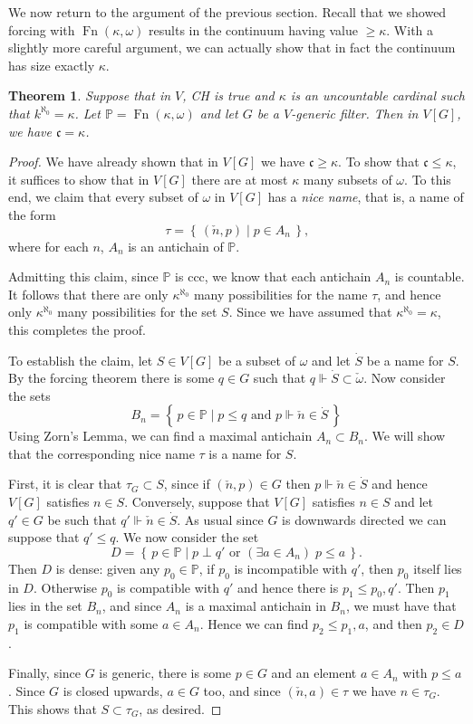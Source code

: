 \documentclass[11pt,oneside]{amsbook}
\newcommand{\set}[1]{\left\{\,#1\,\right\}}
\newcommand{\PP}{\mathbb P}
\newcommand{\forces}{\Vdash}
\DeclareMathOperator{\Fn}{Fn}
\theoremstyle{definition}
\theoremstyle{plain}
\newtheorem{theorem}{Theorem}[section]
\theoremstyle{definition}
\theoremstyle{remark}
\numberwithin{equation}{section}
\numberwithin{figure}{section}
\begin{document}
We now return to the argument of the previous section. Recall that we showed forcing with $\Fn(\kappa,\omega)$ results in the continuum having value $\geq\kappa$. With a slightly more careful argument, we can actually show that in fact the continuum has size exactly $\kappa$.

\begin{theorem}
  \label{thm:ch-exact}
  Suppose that in $V$, CH is true and $\kappa$ is an uncountable cardinal such that $k^{\aleph_0}=\kappa$. Let $\PP=\Fn(\kappa,\omega)$ and let $G$ be a $V$-generic filter. Then in $V[G]$, we have $\mathfrak c=\kappa$.
\end{theorem}

\begin{proof}
  We have already shown that in $V[G]$ we have $\mathfrak c\geq\kappa$. To show that $\mathfrak c\leq\kappa$, it suffices to show that in $V[G]$ there are at most $\kappa$ many subsets of $\omega$. To this end, we claim that every subset of $\omega$ in $V[G]$ has a \emph{nice name}, that is, a name of the form
  \[\tau=\set{(\check n,p)\mid p\in A_n}\text{,}
  \]
  where for each $n$, $A_n$ is an antichain of $\PP$.

  Admitting this claim, since $\PP$ is ccc, we know that each antichain $A_n$ is countable. It follows that there are only $\kappa^{\aleph_0}$ many possibilities for the name $\tau$, and hence only $\kappa^{\aleph_0}$ many possibilities for the set $S$. Since we have assumed that $\kappa^{\aleph_0}=\kappa$, this completes the proof.

  To establish the claim, let $S\in V[G]$ be a subset of $\omega$ and let $\dot S$ be a name for $S$. By the forcing theorem there is some $q\in G$ such that $q\forces\dot S\subset\check\omega$. Now consider the sets
  \[B_n=\set{p\in\PP\mid p\leq q\text{ and }p\forces\check n\in\dot S}
  \]
  Using Zorn's Lemma, we can find a maximal antichain $A_n\subset B_n$. We will show that the corresponding nice name $\tau$ is a name for $S$.

  First, it is clear that $\tau_G\subset S$, since if $(\check n,p)\in G$ then $p\forces\check n\in\dot S$ and hence $V[G]$ satisfies $n\in S$. Conversely, suppose that $V[G]$ satisfies $n\in S$ and let $q'\in G$ be such that $q'\forces\check n\in\dot S$. As usual since $G$ is downwards directed we can suppose that $q'\leq q$. We now consider the set
  \[D=\set{p\in\PP\mid p\perp q'\text{ or }(\exists a\in A_n)\;p\leq a}\text{.}
  \]
  Then $D$ is dense: given any $p_0\in\PP$, if $p_0$ is incompatible with $q'$, then $p_0$ itself lies in $D$. Otherwise $p_0$ is compatible with $q'$ and hence there is $p_1\leq p_0,q'$. Then $p_1$ lies in the set $B_n$, and since $A_n$ is a maximal antichain in $B_n$, we must have that $p_1$ is compatible with some $a\in A_n$. Hence we can find $p_2\leq p_1,a$, and then $p_2\in D$.

  Finally, since $G$ is generic, there is some $p\in G$ and an element $a\in A_n$ with $p\leq a$. Since $G$ is closed upwards, $a\in G$ too, and since $(\check n,a)\in\tau$ we have $n\in\tau_G$. This shows that $S\subset\tau_G$, as desired.
\end{proof}
\end{document}
